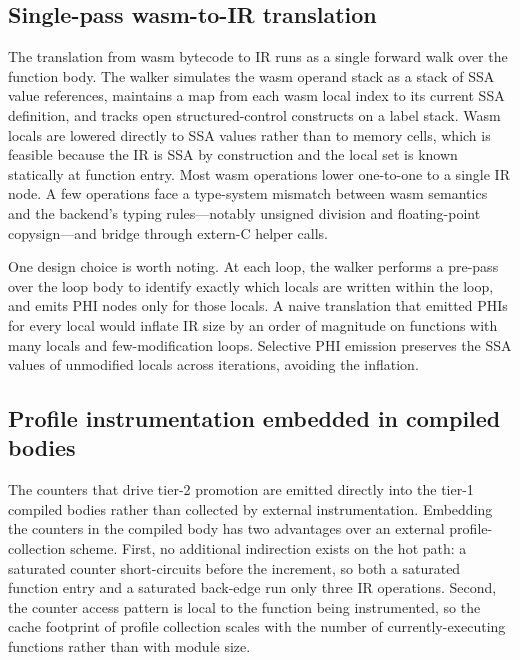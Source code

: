 \subsection{Single-pass wasm-to-IR translation}
\label{sec:design:tier1:translation}

The translation from wasm bytecode to IR runs as a single forward walk over the function body. The walker simulates the wasm operand stack as a stack of SSA value references, maintains a map from each wasm local index to its current SSA definition, and tracks open structured-control constructs on a label stack. Wasm locals are lowered directly to SSA values rather than to memory cells, which is feasible because the IR is SSA by construction and the local set is known statically at function entry. Most wasm operations lower one-to-one to a single IR node. A few operations face a type-system mismatch between wasm semantics and the backend's typing rules---notably unsigned division and floating-point copysign---and bridge through extern-C helper calls.

One design choice is worth noting. At each loop, the walker performs a pre-pass over the loop body to identify exactly which locals are written within the loop, and emits PHI nodes only for those locals. A naive translation that emitted PHIs for every local would inflate IR size by an order of magnitude on functions with many locals and few-modification loops. Selective PHI emission preserves the SSA values of unmodified locals across iterations, avoiding the inflation.

\subsection{Profile instrumentation embedded in compiled bodies}
\label{sec:design:tier1:profile}

The counters that drive tier-2 promotion are emitted directly into the tier-1 compiled bodies rather than collected by external instrumentation. Embedding the counters in the compiled body has two advantages over an external profile-collection scheme. First, no additional indirection exists on the hot path: a saturated counter short-circuits before the increment, so both a saturated function entry and a saturated back-edge run only three IR operations. Second, the counter access pattern is local to the function being instrumented, so the cache footprint of profile collection scales with the number of currently-executing functions rather than with module size.

